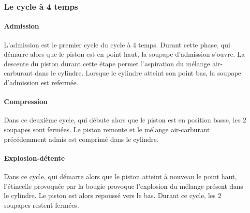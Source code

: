 		\subsubsection{Le cycle à 4 temps}
		\renewcommand{\echelleTikz}{0.5}
		\paragraph{Admission}
		
		L'admission est le premier cycle du cycle à 4 temps. Durant cette phase, qui démarre alors que le piston est en point haut, la soupape d'admission s'ouvre. La descente du piston durant cette étape permet l'aspiration du mélange air-carburant dans le cylindre. Lorsque le cylindre atteint son point bas, la soupape d'admission est refermée.

		\begin{figure}[H]
  		\centering
    		
		\end{figure}	

		\paragraph{Compression}
		
		Dans ce deuxième cycle, qui débute alors que le piston est en position basse, les 2 soupapes sont fermées. Le piston remonte et le mélange air-carburant précédemment admis est comprimé dans le cylindre.
		
		\begin{figure}[H]
  		\centering
    		
		\end{figure}	
		
		\paragraph{Explosion-détente}
		
		Dans ce cycle, qui démarre alors que le piston atteint à nouveau le point haut, l'étincelle provoquée par la bougie provoque l'explosion du mélange présent dans le cylindre. Le piston est alors repoussé vers le bas. Durant ce cycle, les 2 soupapes restent fermées.
		
		\begin{figure}[H]
  		\centering
		
		\end{figure}	
		

